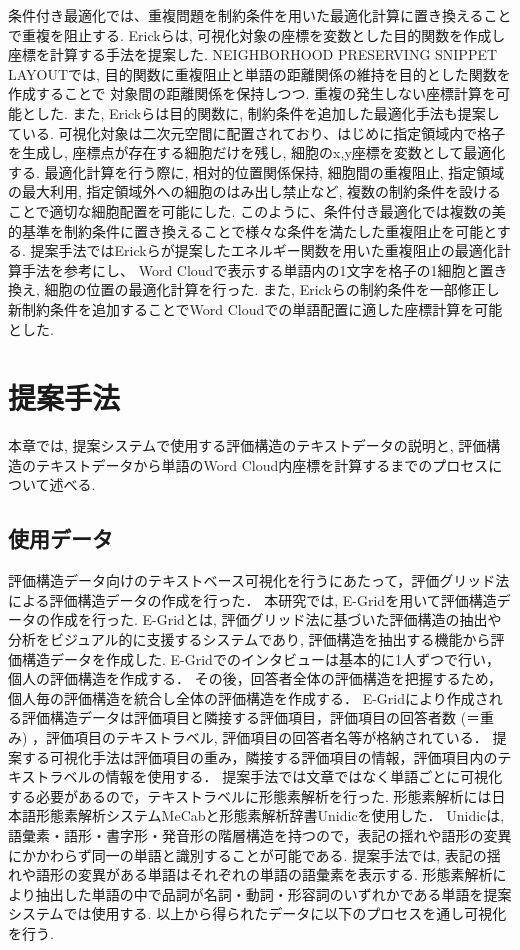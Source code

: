 \documentclass[syuuron]{kuee}
\begin{document}
		条件付き最適化では、重複問題を制約条件を用いた最適化計算に置き換えることで重複を阻止する. 
		Erickらは, 可視化対象の座標を変数とした目的関数を作成し座標を計算する手法を提案した\cite{or1}. 
		NEIGHBORHOOD PRESERVING SNIPPET LAYOUTでは, 目的関数に重複阻止と単語の距離関係の維持を目的とした関数を作成することで
		対象間の距離関係を保持しつつ. 重複の発生しない座標計算を可能とした. 
		また, Erickらは目的関数に, 制約条件を追加した最適化手法も提案している\cite{or2}.  
		可視化対象は二次元空間に配置されており、はじめに指定領域内で格子を生成し, 座標点が存在する細胞だけを残し, 細胞のx,y座標を変数として最適化する. 
		最適化計算を行う際に, 相対的位置関係保持, 細胞間の重複阻止, 指定領域の最大利用, 指定領域外への細胞のはみ出し禁止など, 
		複数の制約条件を設けることで適切な細胞配置を可能にした. 
		このように、条件付き最適化では複数の美的基準を制約条件に置き換えることで様々な条件を満たした重複阻止を可能とする. 
		提案手法ではErickらが提案したエネルギー関数を用いた重複阻止の最適化計算手法を参考にし、
		Word Cloudで表示する単語内の1文字を格子の1細胞と置き換え, 細胞の位置の最適化計算を行った. 
		また, Erickらの制約条件を一部修正し新制約条件を追加することでWord Cloudでの単語配置に適した座標計算を可能とした. 
	

\chapter{提案手法}
	本章では, 提案システムで使用する評価構造のテキストデータの説明と, 評価構造のテキストデータから単語のWord Cloud内座標を計算するまでのプロセスについて述べる. 
	
	\section{使用データ}
		評価構造データ向けのテキストベース可視化を行うにあたって，評価グリッド法による評価構造データの作成を行った．
		本研究では, E-Gridを用いて評価構造データの作成を行った. 
		E-Gridとは, 評価グリッド法に基づいた評価構造の抽出や分析をビジュアル的に支援するシステムであり, 
		評価構造を抽出する機能から評価構造データを作成した. 
		E-Gridでのインタビューは基本的に1人ずつで行い，個人の評価構造を作成する．
		その後，回答者全体の評価構造を把握するため，個人毎の評価構造を統合し全体の評価構造を作成する．
		E-Gridにより作成される評価構造データは評価項目と隣接する評価項目，評価項目の回答者数 (＝重み) ，評価項目のテキストラベル, 評価項目の回答者名等が格納されている．
		提案する可視化手法は評価項目の重み，隣接する評価項目の情報，評価項目内のテキストラベルの情報を使用する．
		提案手法では文章ではなく単語ごとに可視化する必要があるので，テキストラベルに形態素解析を行った. 
		形態素解析には日本語形態素解析システムMeCab\cite{mcb1}と形態素解析辞書Unidicを使用した．
		Unidicは, 語彙素・語形・書字形・発音形の階層構造を持つので，表記の揺れや語形の変異にかかわらず同一の単語と識別することが可能である. 
		提案手法では, 表記の揺れや語形の変異がある単語はそれぞれの単語の語彙素を表示する. 
		形態素解析により抽出した単語の中で品詞が名詞・動詞・形容詞のいずれかである単語を提案システムでは使用する. 
		以上から得られたデータに以下のプロセスを通し可視化を行う. 
		
\end{document}
